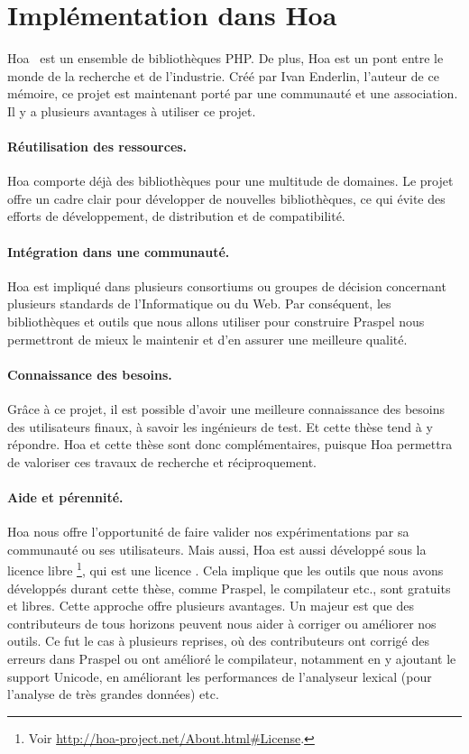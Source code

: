 \section{Implémentation dans Hoa}
\label{section:tools:hoa}

Hoa~ est un ensemble de bibliothèques PHP. De plus, Hoa est un pont
entre le monde de la recherche et de l'industrie. Créé par Ivan Enderlin,
l'auteur de ce mémoire, ce projet est maintenant porté par une communauté et une
association. Il y a plusieurs avantages à utiliser ce projet.

\paragraph{Réutilisation des ressources.} Hoa comporte déjà des bibliothèques
pour une multitude de domaines. Le projet offre un cadre clair pour développer
de nouvelles bibliothèques, ce qui évite des efforts de développement, de
distribution et de compatibilité.

\paragraph{Intégration dans une communauté.} Hoa est impliqué dans plusieurs
consortiums ou groupes de décision concernant plusieurs standards de
l'Informatique ou du Web. Par conséquent, les bibliothèques et outils que nous
allons utiliser pour construire Praspel nous permettront de mieux le maintenir
et d'en assurer une meilleure qualité.

\paragraph{Connaissance des besoins.} Grâce à ce projet, il est possible d'avoir
une meilleure connaissance des besoins des utilisateurs finaux, à savoir les
ingénieurs de test. Et cette thèse tend à y répondre. Hoa et cette thèse sont
donc complémentaires, puisque Hoa permettra de valoriser ces travaux de
recherche et réciproquement.

\paragraph{Aide et pérennité.} Hoa nous offre l'opportunité de faire valider nos
expérimentations par sa communauté ou ses utilisateurs. Mais aussi, Hoa est
aussi développé sous la licence libre \footnote{Voir
\url{http://hoa-project.net/About.html\#License}.}, qui est une licence
. Cela implique que les outils que nous avons développés
durant cette thèse, comme Praspel, le compilateur etc., sont gratuits et libres.
Cette approche offre plusieurs avantages. Un majeur est que des contributeurs de
tous horizons peuvent nous aider à corriger ou améliorer nos outils. Ce fut le
cas à plusieurs reprises, où des contributeurs ont corrigé des erreurs dans
Praspel ou ont amélioré le compilateur, notamment en y ajoutant le support
Unicode, en améliorant les performances de l'analyseur lexical (pour l'analyse
de très grandes données) etc.

